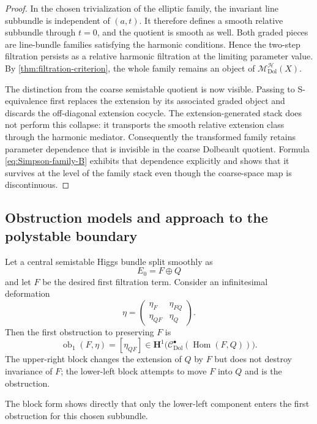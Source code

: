\documentclass[11pt,reqno]{amsart}
\theoremstyle{definition}
\theoremstyle{remark}
\newcommand{\cC}{\mathcal C}
\newcommand{\cH}{\mathcal H}
\newcommand{\Hom}{\operatorname{Hom}}
\newcommand{\Dol}{\mathrm{Dol}}
\newcommand{\MHDol}{\mathscr M^{\cH}_{\Dol}}
\begin{document}
\begin{proof}
In the chosen trivialization of the elliptic family, the invariant line subbundle is independent of $(a,t)$.  It therefore defines a smooth relative subbundle through $t=0$, and the quotient is smooth as well.  Both graded pieces are line-bundle families satisfying the harmonic conditions.  Hence the two-step filtration persists as a relative harmonic filtration at the limiting parameter value.  By \cref{thm:filtration-criterion}, the whole family remains an object of $\MHDol(X)$.

The distinction from the coarse semistable quotient is now visible.  Passing to S-equivalence first replaces the extension by its associated graded object and discards the off-diagonal extension cocycle.  The extension-generated stack does not perform this collapse: it transports the smooth relative extension class through the harmonic mediator.  Consequently the transformed family retains parameter dependence that is invisible in the coarse Dolbeault quotient.  Formula \eqref{eq:Simpson-family-B} exhibits that dependence explicitly and shows that it survives at the level of the family stack even though the coarse-space map is discontinuous.
\end{proof}

\subsection{Obstruction models and approach to the polystable boundary}

Let a central semistable Higgs bundle split smoothly as
\[
  E_0=F\oplus Q
\]
and let $F$ be the desired first filtration term.  Consider an infinitesimal deformation
\[
  \eta=
  \begin{pmatrix}
    \eta_F & \eta_{FQ}\\
    \eta_{QF} & \eta_Q
  \end{pmatrix}.
\]
Then the first obstruction to preserving $F$ is
\begin{equation}\label{eq:block-obstruction}
  \operatorname{ob}_1(F,\eta)
  =[\eta_{QF}]
  \in\mathbf H^1\bigl(\cC^\bullet_{\Dol}(\Hom(F,Q))\bigr).
\end{equation}
The upper-right block changes the extension of $Q$ by $F$ but does not destroy invariance of $F$; the lower-left block attempts to move $F$ into $Q$ and is the obstruction.

The block form shows directly that only the lower-left component enters the first obstruction for this chosen subbundle.
\end{document}
